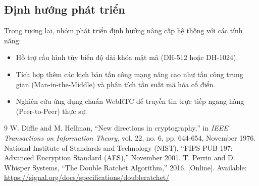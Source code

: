 \documentclass[12pt,a4paper]{article}
\begin{document}
\subsection{Định hướng phát triển}
Trong tương lai, nhóm phát triển định hướng nâng cấp hệ thống với các tính năng:
\begin{itemize}
    \item Hỗ trợ cấu hình tùy biến độ dài khóa mật mã (DH-512 hoặc DH-1024).
    \item Tích hợp thêm các kịch bản tấn công mạng nâng cao như tấn công trung gian (Man-in-the-Middle) và phân tích tần suất mã hóa cổ điển.
    \item Nghiên cứu ứng dụng chuẩn WebRTC để truyền tin trực tiếp ngang hàng (Peer-to-Peer) thực sự.
\end{itemize}

\newpage
\begin{thebibliography}{9}
W. Diffie and M. Hellman, ``New directions in cryptography,'' in \emph{IEEE Transactions on Information Theory}, vol. 22, no. 6, pp. 644-654, November 1976.
National Institute of Standards and Technology (NIST), ``FIPS PUB 197: Advanced Encryption Standard (AES),'' November 2001.
T. Perrin and D. Whisper Systems, ``The Double Ratchet Algorithm,'' 2016. [Online]. Available: \url{https://signal.org/docs/specifications/doubleratchet/}
\end{thebibliography}
\end{document}
